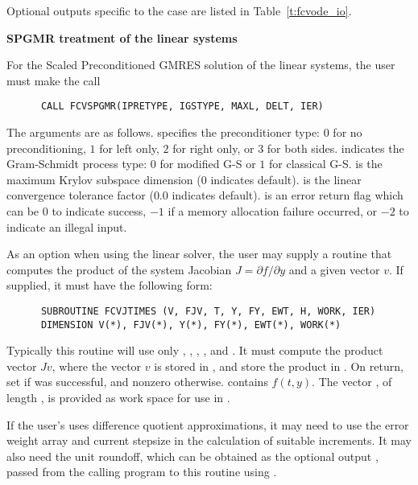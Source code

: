 \begin{Steps}
  Optional outputs specific to the {\band} case are listed in Table~\ref{t:fcvode_io}.
  
  {\s}{\p} {\bf SPGMR treatment of the linear systems}
  
  For the Scaled Preconditioned GMRES solution of the linear systems,
  the user must make the call
\begin{verbatim}
      CALL FCVSPGMR(IPRETYPE, IGSTYPE, MAXL, DELT, IER)
\end{verbatim}
  The arguments are as follows.
   specifies the preconditioner type: 
  $0$ for no preconditioning, $1$ for left only, $2$ for right only, or $3$ for
  both sides.  indicates the Gram-Schmidt process type: 
  $0$ for modified G-S or  $1$ for classical G-S.
   is the maximum Krylov subspace dimension ($0$ indicates default).
   is the linear convergence tolerance factor ($0.0$ indicates default).
   is an error return flag which can be $0$ to indicate success, $-1$
  if a memory allocation failure occurred, or $-2$ to indicate an illegal input.
  
  As an option when using the {\spgmr} linear solver, the user may supply a 
  routine that computes the product of the system Jacobian 
  $J = \partial f / \partial y$ 
  and a given vector $v$.  If supplied, it must have the following form:
\begin{verbatim}
      SUBROUTINE FCVJTIMES (V, FJV, T, Y, FY, EWT, H, WORK, IER)
      DIMENSION V(*), FJV(*), Y(*), FY(*), EWT(*), WORK(*)
\end{verbatim}
  Typically this routine will use only , , , , and
  .  It must compute the product vector $Jv$, where the vector $v$ is
  stored in , and store the product in .  On return, set
   if  was successful, and nonzero otherwise.
   contains $f(t,y)$. The vector , of length , is
  provided as work space for use in .

  If the user's  uses difference quotient approximations, it
  may need to use the error weight array  and current stepsize 
  in the calculation of suitable increments.  It may also need the unit
  roundoff, which can be obtained as the optional output ,
  passed from the calling program to this routine using .


\end{Steps}
